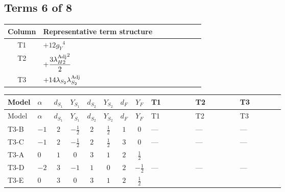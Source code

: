 \documentclass[8pt]{article}
\begin{document}
\begin{landscape}
\subsection*{Terms 6 of 8}
\begin{center}
\begin{tabular}{@{}c >{\raggedright\arraybackslash}p{0.82\linewidth}@{}}
\toprule
Column & Representative term structure \\
\midrule
T1 & \(\displaystyle +12 {g_Y}^4\) \\
\midrule
T2 & \(\displaystyle +\frac{3 {\lambda_{H2}^{\rm Adj}}^2}{2}\) \\
\midrule
T3 & \(\displaystyle +14 {\lambda_{S_2}} {\lambda_{S_2}^{\rm Adj}}\) \\
\midrule
\bottomrule
\end{tabular}
\end{center}
\smallskip
\tiny
\begin{longtable}{@{}llcccccc >{\raggedright\arraybackslash}p{0.21\linewidth} >{\raggedright\arraybackslash}p{0.21\linewidth} >{\raggedright\arraybackslash}p{0.21\linewidth}@{}}
\toprule
Model & $\alpha$ & $d_{S_1}$ & $Y_{S_1}$ & $d_{S_2}$ & $Y_{S_2}$ & $d_F$ & $Y_F$ & T1 & T2 & T3 \\
\midrule
\endfirsthead
\toprule
Model & $\alpha$ & $d_{S_1}$ & $Y_{S_1}$ & $d_{S_2}$ & $Y_{S_2}$ & $d_F$ & $Y_F$ & T1 & T2 & T3 \\
\midrule
\endhead
T3-B & $-1$ & $2$ & $-\frac{1}{2}$ & $2$ & $\frac{1}{2}$ & $1$ & $0$ & --- & --- & --- \\
\midrule
T3-C & $-1$ & $2$ & $-\frac{1}{2}$ & $2$ & $\frac{1}{2}$ & $3$ & $0$ & --- & --- & --- \\
\midrule
T3-A & $0$ & $1$ & $0$ & $3$ & $1$ & $2$ & $\frac{1}{2}$ & \scriptsize\adjustbox{max width=\linewidth}{$\begin{gathered} +12 {g_Y}^4\end{gathered}$} & \scriptsize\adjustbox{max width=\linewidth}{$\begin{gathered} +\frac{3 {\lambda_{H2}^{\rm Adj}}^2}{2}\end{gathered}$} & \scriptsize\adjustbox{max width=\linewidth}{$\begin{gathered} +14 {\lambda_{S_2}} {\lambda_{S_2}^{\rm Adj}}\end{gathered}$} \\
\midrule
T3-D & $-2$ & $3$ & $-1$ & $1$ & $0$ & $2$ & $-\frac{1}{2}$ & --- & --- & --- \\
\midrule
T3-E & $0$ & $3$ & $0$ & $3$ & $1$ & $2$ & $\frac{1}{2}$ & \scriptsize\adjustbox{max width=\linewidth}{$\begin{gathered} +12 {g_Y}^4\end{gathered}$} & \scriptsize\adjustbox{max width=\linewidth}{$\begin{gathered} +\frac{3 {\lambda_{H2}^{\rm Adj}}^2}{2}\end{gathered}$} & \scriptsize\adjustbox{max width=\linewidth}{$\begin{gathered} +14 {\lambda_{S_2}} {\lambda_{S_2}^{\rm Adj}}\end{gathered}$} \\

\end{longtable}
\end{landscape}
\end{document}
